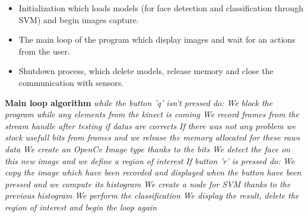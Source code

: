 \begin{itemize}
  \item Initialization which loads models (for face detection and classification through SVM) and begin images capture.
  \item The main loop of the program which display images and wait for an actions from the user.
  \item Shutdown process, which delete models, release memory and close the communication with sensors.
\end{itemize}
\textbf{Main loop algorithm} \newline \newline
\noindent \textit{while the button 'q' isn't pressed do:} \newline \newline \textit{We block the program while any elements from the kinect is coming} \newline \newline \textit{We record frames from the stream handle after testing if datas are corrects} \newline \newline \textit{If there was not any problem we stock usefull bits from frames and we release the memory allocated for these raws data} \newline \newline \textit{We create an OpenCv Image type thanks to the bits} \newline \newline \textit{We detect the face on this new image and we define a region of interest} \newline \newline \textit{If button 'r' is pressed do:} \newline \newline \textit{We copy the image which have been recorded and displayed when the button have been pressed and we compute its histogram} \newline \newline \textit{We create a node for SVM thanks to the previous histogram} \newline \newline \textit{We perform the classification} \newline \newline \textit{We display the result, delete the region of interest and begin the loop again} 
